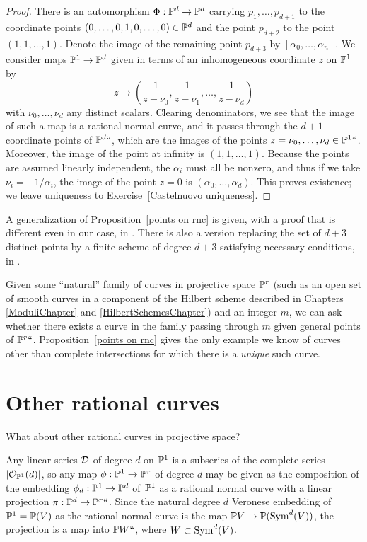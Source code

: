 \begin{proof}
There is an automorphism $\Phi : {\mathbb P}^d \to {\mathbb P}^d$ carrying 
$p_1,\dots,p_{d+1}$ to the coordinate points
$(0,\dots,0,1,0,\dots,0)\in {\mathbb P}^d$ and the point $p_{d+2}$ to the
point $(1,1,\dots,1)$.  Denote the image of the remaining  point
$p_{d+3}$  by $[\alpha_0,\dots,\alpha_n]$. We consider maps ${\mathbb P}^1 \to
{\mathbb P}^d$ given in terms of an inhomogeneous coordinate $z$ on ${\mathbb P}^1$ by
$$
z \mapsto \left( \frac{1}{z - \nu_0}, \frac{1}{z - \nu_1} , \dots, \frac{1}{z - \nu_d}  \right)
$$
with $\nu_0,\dots,\nu_d$ any distinct scalars. Clearing denominators,
we see that the image of such a map is a rational normal curve, and it
passes through the $d+1$ coordinate points of ${\mathbb P}^d` `$, which are
the images of the points $z = \nu_0, \dots, \nu_d \in {\mathbb P}^1` `$. 
Moreover, the image of the point  at infinity is $(1,1,
\dots,1)$. Because the points are assumed linearly independent, the
$\alpha_i$ must all be nonzero, and thus if we take  $\nu_i =
-1/\alpha_i$, the image of the point $z = 0$ is
$(\alpha_0,\dots,\alpha_d)$. This proves existence; we leave
uniqueness to Exercise~\ref{Castelnuovo uniqueness}.
\unif
\end{proof}

\begin{fact}
A generalization of Proposition~\ref{points on rnc} is given, with a proof that is different
even in our case, in \cite[Proposition 3.19]{Montreal}.  There is also a version replacing the set of $d+3$ distinct points by a  finite
scheme of degree $d+3$ satisfying necessary conditions, in \cite{EHLGP}.
\end{fact}

Given some ``natural''
family of curves in projective space ${\mathbb P}^r$ (such as an open set of smooth
curves in a component of the Hilbert scheme 
described in Chapters
\ref{ModuliChapter} and \ref{HilbertSchemesChapter}) 
and an integer $m$, we can ask whether there exists a curve in the
family passing through $m$ given general points of ${\mathbb P}^r` `$. 
Proposition~\ref{points on rnc}
gives the only example we know of curves other than complete
intersections for which there is a \emph{unique} such curve.

\section{Other rational curves}

What about other rational curves in projective space? 

Any linear series ${\cal D}$ of degree $d$ on ${\mathbb P}^1$ is a subseries of the complete series $|{\mathcal O}_{{\mathbb P}^1}(d)|$, so any map $\phi : {\mathbb P}^1 \to {\mathbb P}^r$ of degree $d$ may be given as the
composition of the embedding $\phi_d : {\mathbb P}^1 \to {\mathbb P}^d$ of $\kern1pt{\mathbb P}^1$
as a rational normal curve with a linear projection $\pi : {\mathbb P}^d \to
{\mathbb P}^r` `$. Since the natural degree $d$ 
Veronese embedding
%
of ${\mathbb P}^1 =
{\mathbb P}(V)$ as the rational normal curve is the map
${\mathbb P} V \to {\mathbb P}(\operatorname{Sym}^d(V))$, the projection is a map into ${\mathbb P} W` `$, where $W\subset \operatorname{Sym}^d(V)$. 

